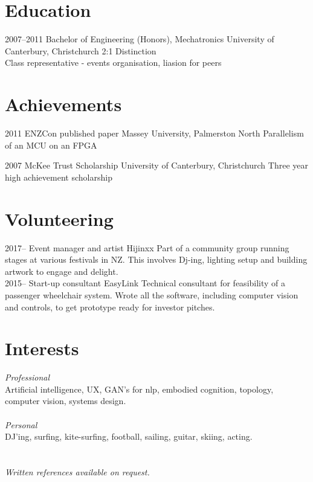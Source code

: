 \documentclass[print]{friggeri-cv} %
\begin{document}
\section{Education}
\begin{entrylist}
\entry
{2007--2011}
{Bachelor of Engineering (Honors), Mechatronics}
{University of Canterbury, Christchurch}
{2:1 Distinction\\
Class representative - events organisation, liasion for peers}
\end{entrylist}
\section{Achievements}
\begin{entrylist}
\entry
{2011}
{ENZCon published paper}
{Massey University, Palmerston North}
{Parallelism of an MCU on an FPGA}

\entry
{2007}
{McKee Trust Scholarship}
{University of Canterbury, Christchurch}
{Three year high achievement scholarship}
\end{entrylist}

\section{Volunteering}
\begin{entrylist}
\entry 
{2017-- }
{Event manager and artist}
{Hijinxx}
{Part of a community group running stages at various festivals in NZ. This involves Dj-ing, lighting setup and building artwork to engage and delight.} \\
\entry
{2015--}
{Start-up consultant}
{EasyLink}
{Technical consultant for feasibility of a passenger wheelchair system. Wrote all the software, including computer vision and controls, to get prototype ready for investor pitches.}
\end{entrylist}

\section{Interests}
\emph{Professional}\\ Artificial intelligence, UX, GAN's for nlp, embodied cognition, topology, computer vision, systems design.\\
\\
\emph{Personal}\\ DJ'ing, surfing, kite-surfing, football, sailing, guitar, skiing, acting.
\\ \\ \\ 
\emph{Written references available on request.}
\end{document}
